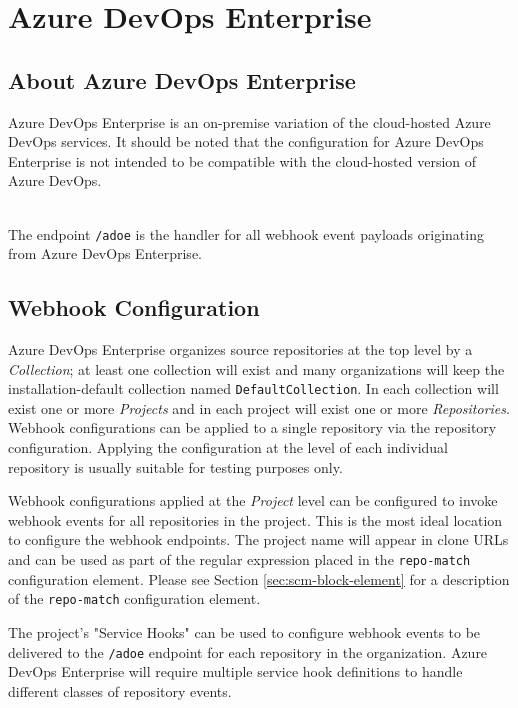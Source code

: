 \chapter{Azure DevOps Enterprise}


\section{About Azure DevOps Enterprise}

Azure DevOps Enterprise is an on-premise variation of the cloud-hosted Azure DevOps services.  It
should be noted that the configuration for Azure DevOps Enterprise is not intended to be
compatible with the cloud-hosted version of Azure DevOps.

\noindent\\The \cxoneflow endpoint \texttt{/adoe} is the handler for all webhook event
payloads originating from Azure DevOps Enterprise.  

\section{Webhook Configuration}

Azure DevOps Enterprise organizes source repositories at the top level by a \textit{Collection};
at least one collection will exist and many organizations will keep the installation-default
collection named \texttt{DefaultCollection}.  In each collection will exist one or more
\textit{Projects} and in each project will exist one or more \textit{Repositories}.  
Webhook configurations can be applied to a single repository via the repository configuration.
Applying the configuration at the level of each individual repository is usually suitable
for testing purposes only.

Webhook configurations applied at the \textit{Project} level can be configured to invoke webhook
events for all repositories in the project.  This is the most ideal location to configure
the webhook endpoints.  The project name will appear in clone URLs and can be used as part of 
the regular expression placed in the \texttt{repo-match} configuration element.  Please see 
Section \ref{sec:scm-block-element} for a description of the \texttt{repo-match} configuration
element.

The project's "Service Hooks" can be used to configure webhook events to be delivered to the
\cxoneflow \texttt{/adoe} endpoint for each repository in the organization.  Azure DevOps
Enterprise will require multiple service hook definitions to handle different classes
of repository events.

